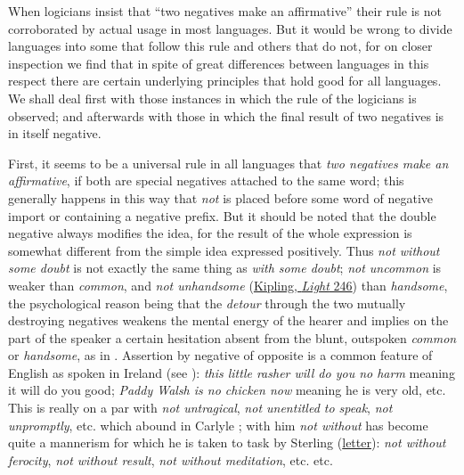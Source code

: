 \label{ch:7}

When logicians insist that ``two negatives make an affirmative'' their rule is not corroborated by actual usage in most languages. But it would be wrong to divide languages into some that follow this rule and others that do not, for on closer inspection we find that in spite of great differences between languages in this respect there are certain underlying principles that hold good for all languages. We shall deal first with those instances in which the rule of the logicians is observed; and afterwards with those in which the final result of two negatives is in itself negative.

First, it seems to be a universal rule in all languages that \textit{two negatives make an affirmative}, if both are special negatives attached to the same word; this generally happens in this way that \textit{not} is placed before some word of negative import or containing a negative prefix. But it should be noted that the double negative always modifies the idea, for the result of the whole expression is somewhat different from the simple idea expressed positively. Thus \textit{not without some doubt} is not exactly the same thing as \textit{with some doubt}; \textit{not uncommon} is weaker than \textit{common}, and \textit{not unhandsome} (\href{https://archive.org/details/lightthatfailed0000rudy_q6g8/page/258/mode/2up?q=%22for+he+was+not%22&view=theater}{Kipling, \textit{Light} 246}) than \textit{handsome}, the psychological reason being that the \textit{detour} through the two mutually destroying negatives weakens the \is{mental energy for comprehension}mental energy of the hearer and implies on the part of the speaker a certain hesitation absent from the blunt, outspoken \textit{common} or \textit{handsome}, as in \refp{ex:07-01}. Assertion by negative of opposite is a common feature of English as spoken in Ireland (see \cite[\href{https://archive.org/details/englishaswespeak00joycuoft/page/15/mode/2up?view=theater}{16}]{joyce1910english}):
\textit{this little rasher will do you no harm} meaning it will do you good; \textit{Paddy Walsh is no chicken now} meaning he is very old, etc. This is really on a par with \textit{not untragical}, \textit{not unentitled to speak}, \textit{not unpromptly}, etc. which abound in Carlyle \citep[\href{https://archive.org/details/englischestudien06leipuoft/page/388/mode/2up?view=theater}{388}]{krummacher1883notizen}; with him \textit{not without} has become quite a mannerism for which he is taken to task by Sterling (\href{https://archive.org/details/lifeofjohnsterli00carliala/page/146/mode/2up?q=%22not+without%22&view=theater}{letter}): \textit{not without ferocity}, \textit{not without result}, \textit{not without meditation}, etc. etc.

